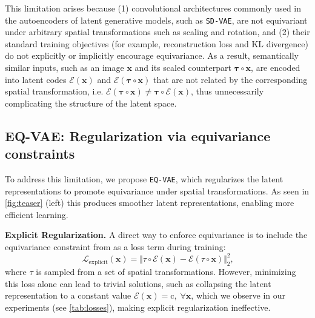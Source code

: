 This limitation arises because (1) convolutional architectures commonly used in the autoencoders of latent generative models, such as \texttt{SD-VAE}, are not equivariant under arbitrary spatial transformations such as scaling and rotation, and (2) their standard training objectives (for example, reconstruction loss and KL divergence) do not explicitly or implicitly encourage equivariance. As a result, semantically similar inputs, such as an image $\mathbf{x}$ and its scaled counterpart $\mathbf{\tau} \circ \mathbf{x}$, are encoded into latent codes $\mathcal{E}(\mathbf{x})$ and $\mathcal{E}(\mathbf{\tau} \circ \mathbf{x})$ that are not related by the corresponding spatial transformation, i.e. $\mathcal{E}(\mathbf{\tau} \circ \mathbf{x}) \neq \mathbf{\tau} \circ \mathcal{E}(\mathbf{x})$, thus unnecessarily complicating the structure of the latent space.

\subsection{EQ-VAE: Regularization via equivariance constraints}
\label{sec:method-eqvae}

To address this limitation, we propose \texttt{EQ-VAE}, which regularizes the latent representations to promote equivariance under spatial transformations.
As seen in \autoref{fig:teaser} (left) this produces smoother latent representations, enabling more efficient learning.

\noindent \textbf{Explicit Regularization.} 
A direct way to enforce equivariance is to include the equivariance constraint from  as a loss term during training:
\begin{equation}
    \label{eq:encoder_loss}
     \mathcal{L}_{\text{explicit}}(\mathbf{x}) = 
     \Vert \tau \circ \mathcal{E}(\mathbf{x}) - \mathcal{E}(\tau \circ  \mathbf{x}) \Vert_2^2 
     \text{,}
\end{equation}
where $\tau$ is sampled from a set of spatial transformations. However, minimizing this loss alone can lead to trivial solutions, such as collapsing the latent representation to a constant value $\mathcal{E}(\mathbf{x}) = \text{c}, \; \forall \mathbf{x}$, which we observe in our experiments (see \autoref{tab:losses}), making explicit regularization ineffective.


